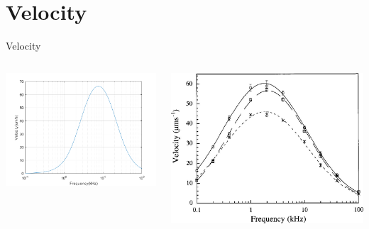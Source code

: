 \documentclass[12pt]{beamer}
\begin{document}
\section{Velocity}
\begin{frame}{Velocity}
    \begin{columns}[onlytextwidth]
        \begin{column}{0.45\textwidth}
            \includegraphics[width=\columnwidth]{7.png}
        \end{column}
        \begin{column}{0.45\textwidth}
            \includegraphics[width=\columnwidth]{8.jpg}
        \end{column}
    \end{columns}
\end{frame}
\end{document}
